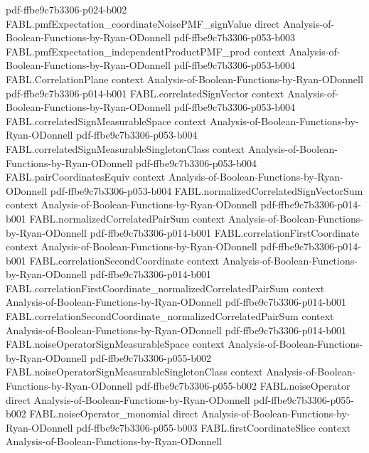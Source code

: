 \begin{theorem}
  {pdf-ffbe9c7b3306-p024-b002}
\proofstep
  {FABL.pmfExpectation_coordinateNoisePMF_signValue}
  {direct}
  {Analysis-of-Boolean-Functions-by-Ryan-ODonnell}
  {pdf-ffbe9c7b3306-p053-b003}
\proofstep
  {FABL.pmfExpectation_independentProductPMF_prod}
  {context}
  {Analysis-of-Boolean-Functions-by-Ryan-ODonnell}
  {pdf-ffbe9c7b3306-p053-b004}
\proofstep
  {FABL.CorrelationPlane}
  {context}
  {Analysis-of-Boolean-Functions-by-Ryan-ODonnell}
  {pdf-ffbe9c7b3306-p014-b001}
\proofstep
  {FABL.correlatedSignVector}
  {context}
  {Analysis-of-Boolean-Functions-by-Ryan-ODonnell}
  {pdf-ffbe9c7b3306-p053-b004}
\proofstep
  {FABL.correlatedSignMeasurableSpace}
  {context}
  {Analysis-of-Boolean-Functions-by-Ryan-ODonnell}
  {pdf-ffbe9c7b3306-p053-b004}
\proofstep
  {FABL.correlatedSignMeasurableSingletonClass}
  {context}
  {Analysis-of-Boolean-Functions-by-Ryan-ODonnell}
  {pdf-ffbe9c7b3306-p053-b004}
\proofstep
  {FABL.pairCoordinatesEquiv}
  {context}
  {Analysis-of-Boolean-Functions-by-Ryan-ODonnell}
  {pdf-ffbe9c7b3306-p053-b004}
\proofstep
  {FABL.normalizedCorrelatedSignVectorSum}
  {context}
  {Analysis-of-Boolean-Functions-by-Ryan-ODonnell}
  {pdf-ffbe9c7b3306-p014-b001}
\proofstep
  {FABL.normalizedCorrelatedPairSum}
  {context}
  {Analysis-of-Boolean-Functions-by-Ryan-ODonnell}
  {pdf-ffbe9c7b3306-p014-b001}
\proofstep
  {FABL.correlationFirstCoordinate}
  {context}
  {Analysis-of-Boolean-Functions-by-Ryan-ODonnell}
  {pdf-ffbe9c7b3306-p014-b001}
\proofstep
  {FABL.correlationSecondCoordinate}
  {context}
  {Analysis-of-Boolean-Functions-by-Ryan-ODonnell}
  {pdf-ffbe9c7b3306-p014-b001}
\proofstep
  {FABL.correlationFirstCoordinate_normalizedCorrelatedPairSum}
  {context}
  {Analysis-of-Boolean-Functions-by-Ryan-ODonnell}
  {pdf-ffbe9c7b3306-p014-b001}
\proofstep
  {FABL.correlationSecondCoordinate_normalizedCorrelatedPairSum}
  {context}
  {Analysis-of-Boolean-Functions-by-Ryan-ODonnell}
  {pdf-ffbe9c7b3306-p014-b001}
\proofstep
  {FABL.noiseOperatorSignMeasurableSpace}
  {context}
  {Analysis-of-Boolean-Functions-by-Ryan-ODonnell}
  {pdf-ffbe9c7b3306-p055-b002}
\proofstep
  {FABL.noiseOperatorSignMeasurableSingletonClass}
  {context}
  {Analysis-of-Boolean-Functions-by-Ryan-ODonnell}
  {pdf-ffbe9c7b3306-p055-b002}
\proofstep
  {FABL.noiseOperator}
  {direct}
  {Analysis-of-Boolean-Functions-by-Ryan-ODonnell}
  {pdf-ffbe9c7b3306-p055-b002}
\proofstep
  {FABL.noiseOperator_monomial}
  {direct}
  {Analysis-of-Boolean-Functions-by-Ryan-ODonnell}
  {pdf-ffbe9c7b3306-p055-b003}
\proofstep
  {FABL.firstCoordinateSlice}
  {context}
  {Analysis-of-Boolean-Functions-by-Ryan-ODonnell}

\end{theorem}
